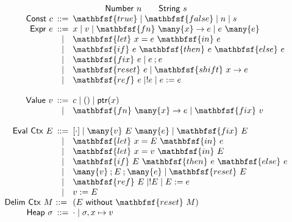 $$
\begin{array}{r@{\ }c@{\ }l}
\multicolumn{3}{c}{\mathsf{Number}\ n \qquad \mathsf{String}\ s} \\
\mathsf{Const}\ c      & ::=  & \mathbfsf{true} \mid \mathbfsf{false} \mid n \mid s \\
\mathsf{Expr}\ e       & ::=  & x \mid v \mid \mathbfsf{fn}\ \many{x} \to e \mid e\ \many{e} \\
                       & \mid & \mathbfsf{let}\ x = e\ \mathbfsf{in}\ e \\
                       & \mid & \mathbfsf{if}\ e\ \mathbfsf{then}\ e\ \mathbfsf{else}\ e \\
                       & \mid & \mathbfsf{fix}\ e \mid e \mathbin{;} e \\
                       & \mid & \mathbfsf{reset}\ e \mid \mathbfsf{shift}\ x \to e \\
                       & \mid & \mathbfsf{ref}\ e \mid !e \mid e := e \\
\\
\mathsf{Value}\ v      & ::=  & c \mid () \mid \mathsf{ptr}(x) \\
       & \mid & \mathbfsf{fn}\ \many{x} \to e \mid \mathbfsf{fix}\ v \\
\\
\mathsf{Eval\ Ctx}\ E      & ::=  & [\cdot] \mid \many{v}\ E\ \many{e} \mid \mathbfsf{fix}\ E \\
       & \mid & \mathbfsf{let}\ x = E\ \mathbfsf{in}\ e \\
       & \mid & \mathbfsf{let}\ x = v\ \mathbfsf{in}\ E \\
       & \mid & \mathbfsf{if}\ E\ \mathbfsf{then}\ e\ \mathbfsf{else}\ e \\
       & \mid & \many{v} \mathbin{;} E \mathbin{;} \many{e} \mid \mathbfsf{reset}\ E \\
       & \mid & \mathbfsf{ref}\ E \mid !E \mid E := e \\
       & \mid & v := E
\\
\mathsf{Delim\ Ctx}\ M      & ::=\  & \mathsf{(} E\ \mathsf{without}\ \mathbfsf{reset}\ M \mathsf{)}
\\
\mathsf{Heap}\ \sigma & ::=  & \cdot \mid \sigma, x \mapsto v
\end{array}
$$
